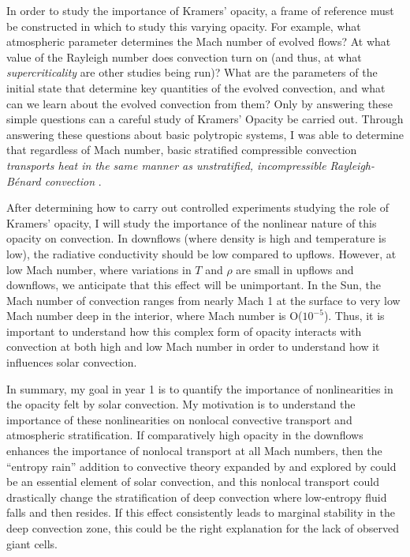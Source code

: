 \documentclass[aasms,12pt]{article}
\newcommand{\RB}{Rayleigh-B\'{e}nard }
\begin{document}
In order to study the importance of Kramers' opacity, a frame of reference must be constructed
in which to study this varying opacity. For example, what atmospheric parameter determines the Mach number
of evolved flows?  At what value of the Rayleigh number
does convection turn on (and thus, at what \emph{supercriticality} are other studies
being run)?  What are the parameters of the initial state that determine key quantities
of the evolved convection, and what can we learn about the evolved convection from them?
Only by answering these simple questions can a careful study of Kramers' Opacity be carried out.
Through answering these questions about basic polytropic systems, I was able to determine that
regardless of Mach number, basic stratified compressible convection \emph{transports heat
in the same manner as unstratified, incompressible \RB convection} \citep{anders&brown2017}.

After determining how to carry out controlled experiments studying the role of Kramers' opacity,
I will study the importance of the nonlinear nature of this opacity on convection.
In downflows (where density is high and temperature is low), the radiative conductivity
should be low compared to upflows.
However, at low Mach number, where variations in $T$ and $\rho$ are small
in upflows and downflows, we anticipate that this effect will be unimportant.  In the Sun,
the Mach number of convection ranges from nearly Mach 1 at the surface to very low Mach number
deep in the interior, where Mach number is O($10^{-5}$).  Thus, it is important to understand how this
complex form of opacity interacts with convection at both high and low Mach number in order to understand
how it influences solar convection.

In summary, my goal in year 1 is to quantify the importance of nonlinearities in the opacity felt by
solar convection.  My motivation is to understand the importance of
these nonlinearities on nonlocal convective transport and atmospheric stratification.  If
comparatively high opacity in the downflows enhances the importance of nonlocal transport at
all Mach numbers, then the ``entropy rain'' addition to convective theory expanded by
\cite{brandenburg2016} and explored by \cite{kapyla&all2017} could be an essential element
of solar convection, and this nonlocal transport could drastically change the stratification of
deep convection where low-entropy fluid falls and then resides.  If this effect consistently leads
to marginal stability in the deep convection zone, this could be the right explanation for the lack
of observed giant cells.
\end{document}
